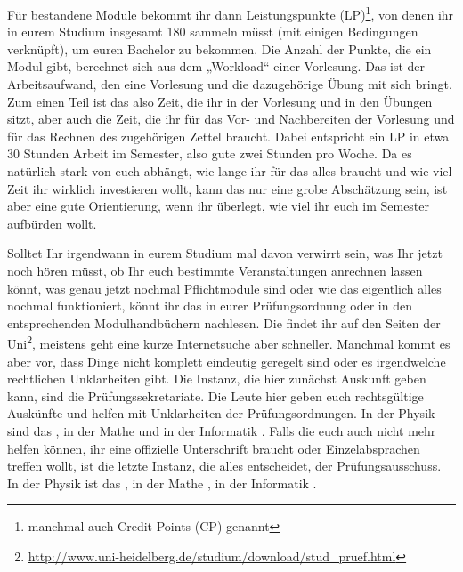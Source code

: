 Für bestandene Module bekommt ihr dann Leistungspunkte (\gls{LP})\footnote{manchmal auch Credit Points (\gls{CP}) genannt}, von denen ihr in eurem Studium insgesamt 180 sammeln müsst (mit einigen Bedingungen verknüpft), um euren Bachelor zu bekommen. Die Anzahl der Punkte, die ein Modul gibt, berechnet sich aus dem „Workload“ einer Vorlesung. Das ist der Arbeitsaufwand, den eine Vorlesung und die dazugehörige Übung mit sich bringt. Zum einen Teil ist das also Zeit, die ihr in der Vorlesung und in den Übungen sitzt, aber auch die Zeit, die ihr für das Vor- und Nachbereiten der Vorlesung und für das Rechnen des zugehörigen Zettel braucht. Dabei entspricht ein \gls{LP} in etwa 30 Stunden Arbeit im Semester, also gute zwei Stunden pro Woche. Da es natürlich stark von euch abhängt, wie lange ihr für das alles braucht und wie viel Zeit ihr wirklich investieren wollt, kann das nur eine grobe Abschätzung sein, ist aber eine gute Orientierung, wenn ihr überlegt, wie viel ihr euch im Semester aufbürden wollt.

Solltet Ihr irgendwann in eurem Studium mal davon verwirrt sein, was Ihr jetzt noch hören müsst, ob Ihr euch bestimmte Veranstaltungen anrechnen lassen könnt, was genau jetzt nochmal Pflichtmodule sind oder wie das eigentlich alles nochmal funktioniert, könnt ihr das in eurer Prüfungsordnung oder in den entsprechenden Modulhandbüchern nachlesen. Die findet ihr auf den Seiten der Uni\footnote{\url{http://www.uni-heidelberg.de/studium/download/stud_pruef.html}}, meistens geht eine kurze Internetsuche aber schneller. Manchmal kommt es aber vor, dass Dinge nicht komplett eindeutig geregelt sind oder es irgendwelche rechtlichen Unklarheiten gibt. Die Instanz, die hier zunächst Auskunft geben kann, sind die Prüfungssekretariate. Die Leute hier geben euch rechtsgültige Auskünfte und helfen mit Unklarheiten der Prüfungsordnungen. In der Physik sind das \pruefsekphysik, in der Mathe \pruefsekmathe und in der Informatik \pruefsekinfo. Falls die euch auch nicht mehr helfen können, ihr eine offizielle Unterschrift braucht oder Einzelabsprachen treffen wollt, ist die letzte Instanz, die alles entscheidet, der Prüfungsausschuss. In der Physik ist das \pruefausschussvorsitzphysik, in der Mathe \pruefausschussvorsitzmathe, in der Informatik \pruefausschussvorsitzinformatik.
